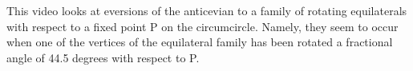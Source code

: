 This video looks at eversions of the anticevian to a family of rotating equilaterals with respect to a fixed point P on the circumcircle. Namely, they seem to occur when one of the vertices of the equilateral family has been rotated a fractional angle of 44.5 degrees with respect to P.